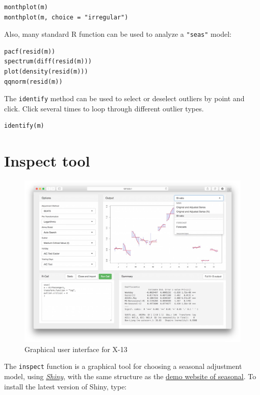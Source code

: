 \begin{verbatim}
monthplot(m)
monthplot(m, choice = "irregular")
\end{verbatim}

Also, many standard R function can be used to analyze a \texttt{"seas"}
model:

\begin{verbatim}
pacf(resid(m))
spectrum(diff(resid(m)))
plot(density(resid(m)))
qqnorm(resid(m))
\end{verbatim}

The \texttt{identify} method can be used to select or deselect outliers
by point and click. Click several times to loop through different
outlier types.

\begin{verbatim}
identify(m)
\end{verbatim}

\section{Inspect tool}\label{inspect-tool}

\begin{figure}[htbp]
\centering
\includegraphics[width=\textwidth]{images/inspect.jpg}
\caption{Graphical user interface for X-13}
\end{figure}

The \texttt{inspect} function is a graphical tool for choosing a
seasonal adjustment model, using
\emph{\href{http://shiny.rstudio.com}{Shiny}}, with the same structure
as the \href{http://www.seasonal.website}{demo website of seasonal}. To
install the latest version of Shiny, type:


